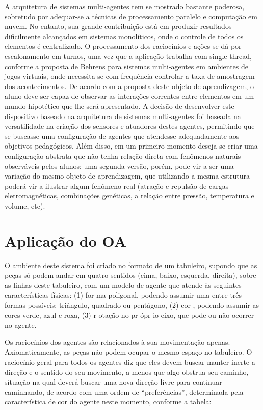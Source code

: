 \documentclass{article}
\begin{document}
A arquitetura de sistemas multi-agentes tem se mostrado bastante poderosa,
sobretudo por adequar-se a técnicas de processamento paralelo e computação em
nuvem. No entanto, sua grande contribuição está em produzir resultados dificilmente
alcançados em sistemas monolíticos, onde o controle de todos os elementos é
centralizado. O processamento dos raciocínios e ações se dá por escalonamento em
turnos, uma vez que a aplicação trabalha com single-thread, conforme a proposta de
Behrens para sistemas multi-agentes em ambientes de jogos virtuais, onde necessita-se
com frequência controlar a taxa de amostragem dos acontecimentos.
De acordo com a proposta deste objeto de aprendizagem, o aluno deve ser capaz
de observar as interações correntes entre elementos em um mundo hipotético que lhe
será apresentado. A decisão de desenvolver este dispositivo baseado na arquitetura de
sistemas multi-agentes foi baseada na versatilidade na criação dos sensores e atuadores
destes agentes, permitindo que se buscasse uma configuração de agentes que atendesse
adequadamente aos objetivos pedagógicos. Além disso, em um primeiro momento
deseja-se criar uma configuração abstrata que não tenha relação direta com fenômenos
naturais observáveis pelos alunos; uma segunda versão, porém, pode vir a ser uma
variação do mesmo objeto de aprendizagem, que utilizando a mesma estrutura poderá
vir a ilustrar algum fenômeno real (atração e repulsão de cargas eletromagnéticas,
combinações genéticas, a relação entre pressão, temperatura e volume, etc).

\section{Aplicação do OA}

O ambiente deste sistema foi criado no formato de um tabuleiro, supondo que as peças
só podem andar em quatro sentidos (cima, baixo, esquerda, direita), sobre as linhas
deste tabuleiro, com um modelo de agente que atende às seguintes características
físicas: (1) for ma poligonal, podendo assumir uma entre três formas possíveis:
triângulo, quadrado ou pentágono, (2) cor , podendo assumir as cores verde, azul e roxa,
(3) r otação no pr ópr io eixo, que pode ou não ocorrer no agente.

Os raciocínios dos agentes são relacionados à sua movimentação apenas.
Axiomaticamente, as peças não podem ocupar o mesmo espaço no tabuleiro. O
raciocínio geral para todos os agentes diz que eles devem buscar manter inerte a direção
e o sentido do seu movimento, a menos que algo obstrua seu caminho, situação na qual
deverá buscar uma nova direção livre para continuar caminhando, de acordo com uma
ordem de “preferências”, determinada pela característica de cor do agente neste
momento, conforme a tabela:
\end{document}
